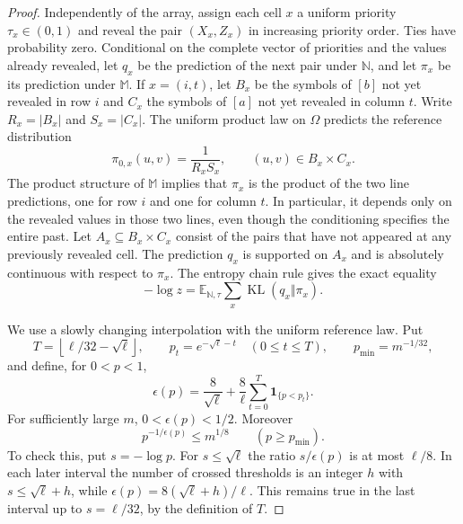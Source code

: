 \begin{proof}
Independently of the array, assign each cell $x$ a uniform priority
$\tau_x\in(0,1)$ and reveal the pair $(X_x,Z_x)$ in increasing
priority order. Ties have probability zero. Conditional on the
complete vector of priorities and the values already revealed,
let $q_x$ be the prediction of the next pair under $\mathbb N$,
and let $\pi_x$ be its prediction under $\mathbb M$. If $x=(i,t)$,
let $B_x$ be the symbols of $[b]$ not yet revealed in row $i$ and
$C_x$ the symbols of $[a]$ not yet revealed in column $t$.
Write $R_x=|B_x|$ and $S_x=|C_x|$. The uniform product law on
$\Omega$ predicts the reference distribution
\[
 \pi_{0,x}(u,v)=\frac1{R_xS_x},\qquad (u,v)\in B_x\times C_x.
\]
The product structure of $\mathbb M$ implies that $\pi_x$ is the
product of the two line predictions, one for row $i$ and one for
column $t$. In particular, it depends only on the revealed values
in those two lines, even though the conditioning specifies the
entire past. Let $A_x\subseteq B_x\times C_x$ consist of the
pairs that have not appeared at any previously revealed cell.
The prediction $q_x$ is supported on $A_x$ and is absolutely
continuous with respect to $\pi_x$. The entropy chain rule gives
the exact equality
\begin{equation}\label{rec:smoothed-exposure-KL}
 -\log z
 =\mathbb E_{\mathbb N,\tau}\sum_x
                              \operatorname{KL}(q_x\Vert\pi_x).
\end{equation}

We use a slowly changing interpolation with the uniform reference
law. Put
\[
 T=\left\lfloor\ell/32-\sqrt\ell\right\rfloor,
 \qquad p_t=e^{-\sqrt\ell-t}\quad(0\le t\le T),
 \qquad p_{\min}=m^{-1/32},
\]
and define, for $0<p<1$,
\begin{equation}\label{rec:smoothed-epsilon-schedule}
 \epsilon(p)=\frac8{\sqrt\ell}
              +\frac8\ell\sum_{t=0}^T\mathbf1_{\{p<p_t\}}.
\end{equation}
For sufficiently large $m$, $0<\epsilon(p)<1/2$. Moreover
\begin{equation}\label{rec:smoothed-epsilon-bound}
 p^{-1/\epsilon(p)}\le m^{1/8}
                 \qquad(p\ge p_{\min}).
\end{equation}
To check this, put $s=-\log p$. For $s\le\sqrt\ell$ the
ratio $s/\epsilon(p)$ is at most $\ell/8$. In each later
interval the number of crossed thresholds is an integer $h$ with
$s\le\sqrt\ell+h$, while
$\epsilon(p)=8(\sqrt\ell+h)/\ell$. This remains true in the
last interval up to $s=\ell/32$, by the definition of $T$.


\end{proof}
